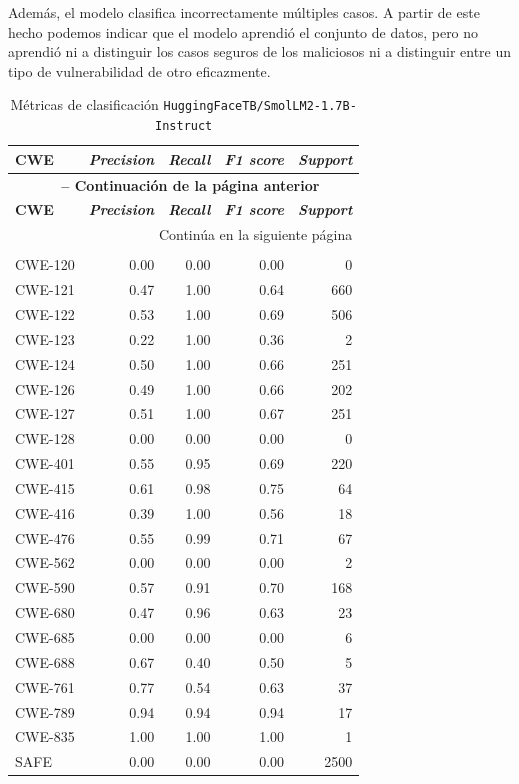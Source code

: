 \documentclass[12pt, a4paper, twoside]{article}
\begin{document}
Además, el modelo clasifica incorrectamente múltiples casos. A partir de este hecho podemos indicar que el modelo aprendió el conjunto de datos, pero no aprendió ni a distinguir los casos seguros de los maliciosos ni a distinguir entre un tipo de vulnerabilidad de otro eficazmente.

\begin{longtable}{lrrrr}
	\caption{Métricas de clasificación \texttt{HuggingFaceTB/SmolLM2-1.7B-Instruct}}
	\label{fig:validation-huggingfacetb-smollm2-1_7B-instruct-fine-tuned} \\
	\toprule
	\textbf{CWE} & \textbf{\textit{Precision}} & \textbf{\textit{Recall}} & \textbf{\textit{F1 score}} & \textbf{\textit{Support}} \\
	\midrule
	\endfirsthead
	\multicolumn{5}{c}{{\bfseries \tablename\ \thetable{} -- Continuación de la página anterior}} \\
	\toprule
	\textbf{CWE} & \textbf{\textit{Precision}} & \textbf{\textit{Recall}} & \textbf{\textit{F1 score}} & \textbf{\textit{Support}} \\
	\midrule
	\endhead
	\midrule
	\multicolumn{5}{r}{Continúa en la siguiente página} \\
	\endfoot
	\midrule
	\multicolumn{5}{l}{\textbf{\textit{Global Accuracy}:} 0.49 (49\%) -- Total de pruebas: 5.000} \\
	\bottomrule
	\endlastfoot
	CWE-120 &  0.00 & 0.00 & 0.00 &    0 \\
	CWE-121 &  0.47 & 1.00 & 0.64 &  660 \\
	CWE-122 &  0.53 & 1.00 & 0.69 &  506 \\
	CWE-123 &  0.22 & 1.00 & 0.36 &    2 \\
	CWE-124 &  0.50 & 1.00 & 0.66 &  251 \\
	CWE-126 &  0.49 & 1.00 & 0.66 &  202 \\
	CWE-127 &  0.51 & 1.00 & 0.67 &  251 \\
	CWE-128 &  0.00 & 0.00 & 0.00 &    0 \\
	CWE-401 &  0.55 & 0.95 & 0.69 &  220 \\
	CWE-415 &  0.61 & 0.98 & 0.75 &   64 \\
	CWE-416 &  0.39 & 1.00 & 0.56 &   18 \\
	CWE-476 &  0.55 & 0.99 & 0.71 &   67 \\
	CWE-562 &  0.00 & 0.00 & 0.00 &    2 \\
	CWE-590 &  0.57 & 0.91 & 0.70 &  168 \\
	CWE-680 &  0.47 & 0.96 & 0.63 &   23 \\
	CWE-685 &  0.00 & 0.00 & 0.00 &    6 \\
	CWE-688 &  0.67 & 0.40 & 0.50 &    5 \\
	CWE-761 &  0.77 & 0.54 & 0.63 &   37 \\
	CWE-789 &  0.94 & 0.94 & 0.94 &   17 \\
	CWE-835 &  1.00 & 1.00 & 1.00 &    1 \\
	SAFE    &  0.00 & 0.00 & 0.00 & 2500 \\

\end{longtable}
\end{document}
